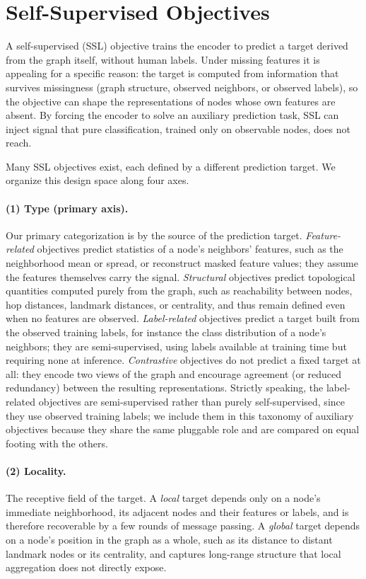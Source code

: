 \section{Self-Supervised Objectives}
\label{sec:ssl-objectives}

A self-supervised (SSL) objective trains the encoder to predict a target derived from the graph itself, without human labels. 
Under missing features it is appealing for a specific reason: the target is computed from information that survives missingness (graph structure, observed neighbors, or observed labels), so the objective can shape the representations of nodes whose own features are absent. 
By forcing the encoder to solve an auxiliary prediction task, SSL can inject signal that pure classification, trained only on observable nodes, does not reach.

Many SSL objectives exist, each defined by a different prediction target. We organize this design space along four axes.

\paragraph{(1) Type (primary axis).} Our primary categorization is by the source of the prediction target. \emph{Feature-related} objectives predict statistics of a node's neighbors' features, such as the neighborhood mean or spread, or reconstruct masked feature values; they assume the features themselves carry the signal.
\emph{Structural} objectives predict topological quantities computed purely from the graph, such as reachability between nodes, hop distances, landmark distances, or centrality, and thus remain defined even when no features are observed.
\emph{Label-related} objectives predict a target built from the observed training labels, for instance the class distribution of a node's neighbors; they are semi-supervised, using labels available at training time but requiring none at inference.
\emph{Contrastive} objectives do not predict a fixed target at all: they encode two views of the graph and encourage agreement (or reduced redundancy) between the resulting representations.
Strictly speaking, the label-related objectives are semi-supervised rather than purely self-supervised, since they use observed training labels; we include them in this taxonomy of auxiliary objectives because they share the same pluggable role and are compared on equal footing with the others.

\paragraph{(2) Locality.} The receptive field of the target. A \emph{local} target depends only on a node's immediate neighborhood, its adjacent nodes and their features or labels, and is therefore recoverable by a few rounds of message passing. 
A \emph{global} target depends on a node's position in the graph as a whole, such as its distance to distant landmark nodes or its centrality, and captures long-range structure that local aggregation does not directly expose.

